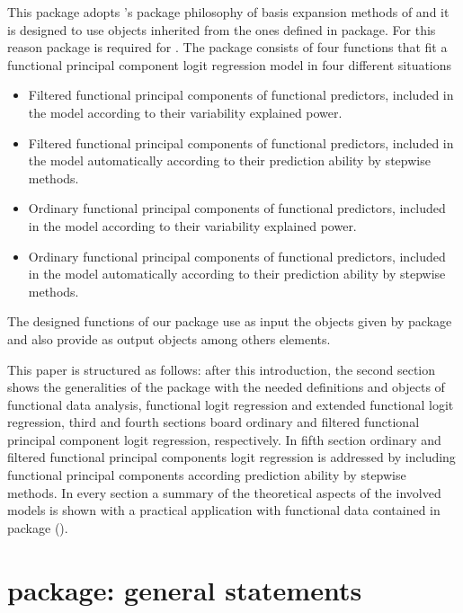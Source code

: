 This package adopts 's package philosophy of basis expansion methods of \cite{Ramsay09} and it is designed to use objects inherited from the ones defined in  package. For this reason  package is required for . The package consists of four functions that fit a functional principal component logit regression model in four different situations
\begin{itemize}
 \item Filtered functional principal components of functional predictors, included in the model according to their variability explained power.
 \item Filtered functional principal components  of functional predictors, included in the model automatically according to their prediction ability by stepwise methods.
 \item Ordinary functional principal components of functional predictors, included in the model according to their variability explained power.
 \item Ordinary functional principal components of functional predictors, included in the model automatically according to their prediction ability by stepwise methods.
\end{itemize}

The designed functions of our package use as input the  objects given by  package and also provide as output  objects among others elements.

This paper is structured as follows: after this introduction, the second section shows the generalities of the package with the needed definitions and objects of functional data analysis, functional logit regression and extended functional logit regression, third and fourth sections board ordinary and filtered functional principal component logit regression, respectively. In fifth section ordinary and filtered functional principal components logit regression is addressed by including functional principal components according prediction ability by stepwise methods. In every section a summary of the theoretical aspects of the involved models is shown with a practical application with functional data contained in  package (\cite{Febrero2012}).

\section{ package: general statements}


